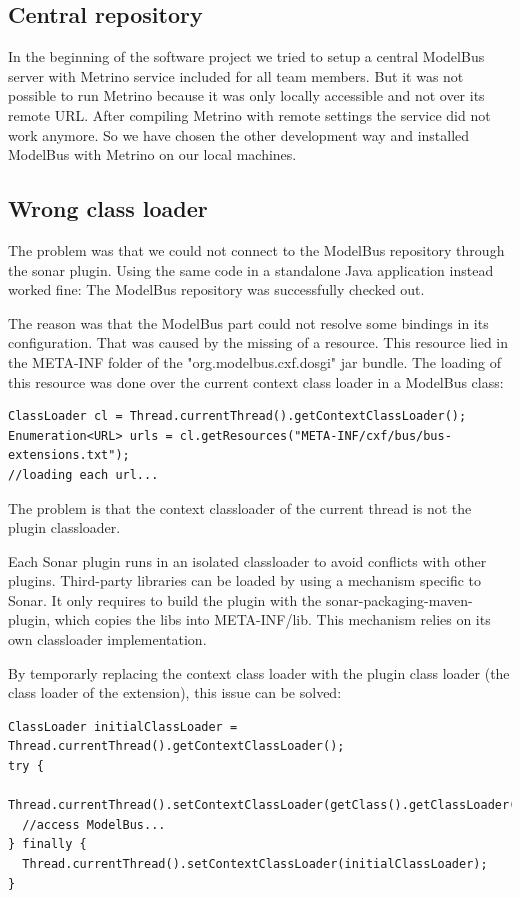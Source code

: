 
\subsection{Central repository}
In the beginning of the software project we tried to setup a central ModelBus server with Metrino service included for all team members. But it was not possible to run Metrino because it was only locally accessible and not over its remote URL. After compiling Metrino with remote settings the service did not work anymore. So we have chosen the other development way and installed ModelBus with Metrino on our local machines.
		
\subsection{Wrong class loader}
The problem was that we could not connect to the ModelBus repository through the sonar plugin. Using the same code in a standalone Java application instead worked fine: The ModelBus repository was successfully checked out.

The reason was that the ModelBus part could not resolve some bindings in its configuration. That was caused by the missing of a resource. This resource lied in the META-INF folder of the "org.modelbus.cxf.dosgi" jar bundle. The loading of this resource was done over the current context class loader in a ModelBus class:

\begin{verbatim}
ClassLoader cl = Thread.currentThread().getContextClassLoader();
Enumeration<URL> urls = cl.getResources("META-INF/cxf/bus/bus-extensions.txt");
//loading each url...
\end{verbatim}

The problem is that the context classloader of the current thread is not the plugin classloader.

Each Sonar plugin runs in an isolated classloader to avoid conflicts with other plugins. Third-party libraries can be loaded by using a mechanism specific to Sonar. It only requires to build the plugin with the sonar-packaging-maven-plugin, which copies the libs into META-INF/lib. This mechanism relies on its own classloader implementation.

By temporarly replacing the context class loader with the plugin class loader (the class loader of the extension), this issue can be solved:
\begin{verbatim}
ClassLoader initialClassLoader = Thread.currentThread().getContextClassLoader();
try {
  Thread.currentThread().setContextClassLoader(getClass().getClassLoader());
  //access ModelBus...
} finally {
  Thread.currentThread().setContextClassLoader(initialClassLoader);
}
\end{verbatim}

